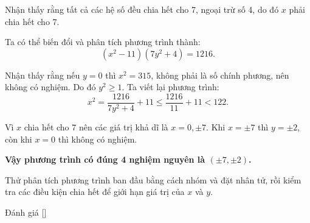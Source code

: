 \ifshowproblemandsoln
\ifshowproblem{}
\fi

\ifshowsoln
\begin{soln}\footnotemark
    Nhận thấy rằng tất cả các hệ số đều chia hết cho 7, ngoại trừ số 4, do đó \(x\) phải chia hết cho 7.

    Ta có thể biến đổi và phân tích phương trình thành:
    \[
        (x^2 - 11)(7y^2 + 4) = 1216.
    \]

    Nhận thấy rằng nếu \(y = 0\) thì \(x^2 = 315\), không phải là số chính phương, nên không có nghiệm. Do đó \(y^2 \geq 1\). Ta viết lại phương trình:
    \[
        x^2 = \frac{1216}{7y^2 + 4} + 11 \leq \frac{1216}{11} + 11 < 122.
    \]

    Vì \(x\) chia hết cho 7 nên các giá trị khả dĩ là \(x = 0, \pm7\). Khi \(x = \pm7\) thì \(y = \pm2\), còn khi \(x = 0\) thì không có nghiệm.

    \textbf{Vậy phương trình có đúng 4 nghiệm nguyên là \( (\pm7, \pm2) \).}
\end{soln}
\fi

\ifshowhint
\begin{hint}
    Thử phân tích phương trình ban đầu bằng cách nhóm và đặt nhân tử, rồi kiểm tra các điều kiện chia hết để giới hạn giá trị của \(x\) và \(y\).
\end{hint}
\fi

\ifshowremark
\begin{remark*}
    Đánh giá [\textbf{}]
\end{remark*}
\newpage
\fi